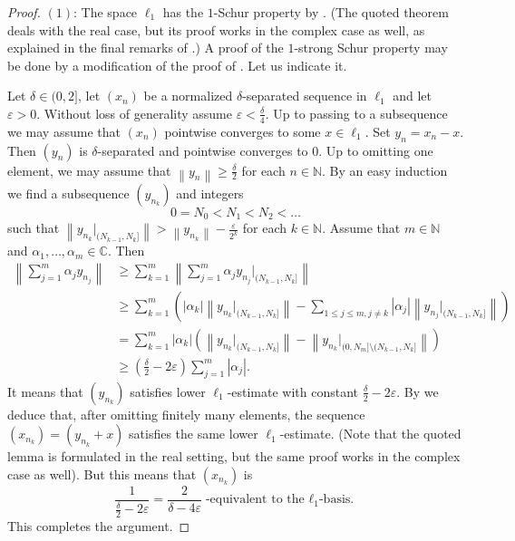 \documentclass{amsart}
\numberwithin{equation}{section}
\theoremstyle{definition}
\def\ce{\mathbb C}
\def\ep{\varepsilon}
\def\en{\mathbb N}
\newcommand{\norm}[1]{\left\|#1\right\|}
\newcommand{\abs}[1]{\left|#1\right|}
\begin{document}
\begin{proof}
     $(1)$:  The space $\ell_1$ has the $1$-Schur property by \cite[Theorem 1.3]{qschur}. (The quoted theorem deals with the real case, but its proof works in the complex case as well, as explained in the final remarks of \cite{qschur}.)  A proof of the $1$-strong Schur property may be done by a modification of the proof of \cite[Theorem 1.3]{qschur}. Let us indicate it.

     Let $\delta\in(0,2]$, let $(x_n)$ be a normalized $\delta$-separated sequence in $\ell_1$ and let $\ep>0$. Without loss of generality assume $\ep<\frac\delta4$. Up to passing to a subsequence we may assume that $(x_n)$ pointwise converges to some $x\in\ell_1$. Set $y_n=x_n-x$. Then $(y_n)$ is $\delta$-separated and pointwise converges to $0$. Up to omitting one element, we may assume that $\norm{y_n}\ge\frac{\delta}{2}$ for each $n\in\en$. By an easy induction we find a subsequence $(y_{n_k})$
     and integers 
     $$0=N_0<N_1<N_2<\dots$$
     such that $\norm{y_{n_k}|_{(N_{k-1},N_k]}}>\norm{y_{n_k}}-\frac{\ep}{2^k}$ for each $k\in\en$.
     Assume that $m\in\en$ and $\alpha_1,\dots,\alpha_m\in\ce$. Then
     $$\begin{aligned}
        \norm{\sum_{j=1}^m\alpha_j y_{n_j}}&\ge \sum_{k=1}^m\norm{\sum_{j=1}^m\alpha_j y_{n_j}|_{(N_{k-1},N_k]}}
        \\&\ge \sum_{k=1}^m\left(\abs{\alpha_k}\norm{y_{n_k}|_{(N_{k-1},N_k]}}-\sum_{1\le j\le m, j\ne k}\abs{\alpha_j}\norm{ y_{n_j}|_{(N_{k-1},N_k]}}\right)
        \\&=  \sum_{k=1}^m\abs{\alpha_k}(\norm{y_{n_k}|_{(N_{k-1},N_k]}} - \norm{y_{n_k}|_{(0,N_m]\setminus (N_{k-1},N_k]}})\\&\ge(\tfrac\delta2-2\ep)\sum_{j=1}^m \abs{\alpha_j}.
     \end{aligned}$$
    It means that $(y_{n_k})$ satisfies lower $\ell_1$-estimate with constant $\frac\delta2-2\ep$. By \cite[Lemma 4.2]{knaust-odell} we deduce that, after omitting finitely many elements, the sequence $(x_{n_k})=(y_{n_k}+x)$ satisfies the same lower $\ell_1$-estimate. (Note that the quoted lemma is formulated in the real setting, but the same proof works in the complex case as well). But this means that $(x_{n_k})$ is
    $$\frac{1}{\tfrac\delta2-2\ep}=\frac{2}{\delta-4\ep}\mbox{-equivalent to the $\ell_1$-basis.}$$ This completes the argument.


\end{proof}
\end{document}
